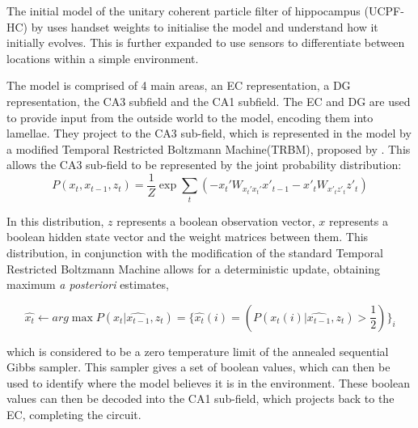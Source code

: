 The initial model of the unitary coherent particle filter of hippocampus (UCPF-HC) by \cite{foxandprescott2010A} uses handset weights to initialise the model and understand how it initially evolves. 
This is further expanded to use sensors to differentiate between locations within a simple environment.


The model is comprised of 4 main areas, an EC representation, a DG representation, the CA3 subfield and the CA1 subfield.
The EC and DG are used to provide input from the outside world to the model, encoding them into lamellae.
They project to the CA3 sub-field, which is represented in the model by a modified Temporal Restricted Boltzmann Machine(TRBM), proposed by \citep{hintonDBN2006}.
This allows the CA3 sub-field to be represented by the joint probability distribution:
\begin{equation}
    P(x_t, x_{t-1}, z_t) = \frac{1}{Z}\exp\sum_t(-x_t' W_{x_t'x_t'} x'_{t-1} - x'_tW_{x'_tz'_t}z'_t )
\end{equation}

In this distribution, $z$ represents a boolean observation vector, $x$ represents a boolean hidden state vector and the weight matrices between them.
This distribution, in conjunction with the modification of the standard Temporal Restricted Boltzmann Machine allows for a deterministic update, obtaining maximum \textit{a posteriori} estimates,

\begin{equation}
    \hat{x_t} \leftarrow arg \max   P(x_t|\hat{x_{t-1}},z_t) = \{\hat{x_t}(i)=(P(x_t(i)|\hat{x_{t-1}},z_t) > \frac{1}{2})\}_i
    \label{eqn:post}
\end{equation}

which is considered to be a zero temperature limit of the annealed sequential Gibbs sampler.
This sampler gives a set of boolean values, which can then be used to identify where the model believes it is in the environment. 
These boolean values can then be decoded into the CA1 sub-field, which projects back to the EC, completing the circuit.




